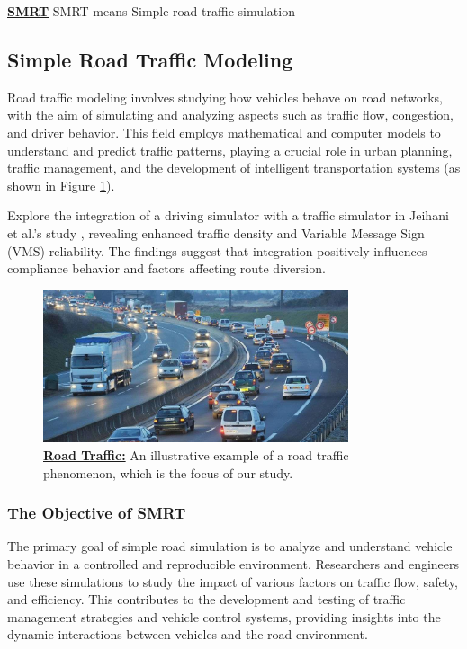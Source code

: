 \documentclass{article}
\begin{document}
		\textbf{\underline{SMRT}} \newline\newline
		SMRT means Simple road traffic simulation
	
	\subsection{Simple Road Traffic Modeling}
	
		Road traffic modeling involves studying how vehicles behave on road networks, with the aim of simulating and analyzing aspects such as traffic flow, congestion, and driver behavior. This field employs mathematical and computer models to understand and predict traffic patterns, playing a crucial role in urban planning, traffic management, and the development of intelligent transportation systems (as shown in Figure \ref{fig:intro}). 
		
		Explore the integration of a driving simulator with a traffic simulator in Jeihani et al.'s study \cite{JEIHANI2017164}, revealing enhanced traffic density and Variable Message Sign (VMS) reliability. The findings suggest that integration positively influences compliance behavior and factors affecting route diversion.
		
		
		\begin{figure}[H]
			\centering
			\includegraphics[width=0.8\textwidth]{intro.jpg}
			\caption{\textbf{\underline{Road Traffic:}} An illustrative example of a road traffic phenomenon, which is the focus of our study.}
			\label{fig:intro}
		\end{figure}
	
		
		\subsubsection{The Objective of SMRT}
		The primary goal of simple road simulation is to analyze and understand vehicle behavior in a controlled and reproducible environment. Researchers and engineers use these simulations to study the impact of various factors on traffic flow, safety, and efficiency. This contributes to the development and testing of traffic management strategies and vehicle control systems, providing insights into the dynamic interactions between vehicles and the road environment.
		
\end{document}

